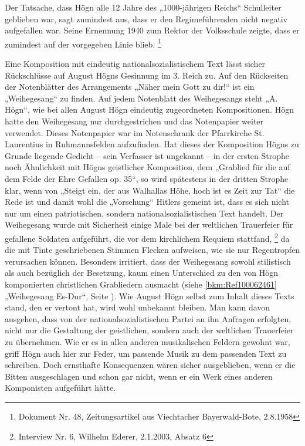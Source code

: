 Der Tatsache, dass Högn alle 12 Jahre des „1000-jährigen Reichs“
Schulleiter geblieben war, sagt zumindest aus, dass er den
Regimeführenden nicht negativ aufgefallen war. Seine Ernennung 1940 zum
Rektor der Volksschule zeigte, dass er zumindest auf der vorgegeben
Linie blieb. \footnote{Dokument Nr. 48, Zeitungsartikel aus Viechtacher
Bayerwald-Bote, 2.8.1958}

Eine Komposition mit eindeutig nationalsozialistischem Text lässt sicher
Rückschlüsse auf August Högns Gesinnung im 3. Reich zu. Auf den
Rückseiten der Notenblätter des Arrangements „Näher mein Gott zu dir!“
ist ein „Weihegesang“ zu finden. Auf jedem Notenblatt des Weihegesangs
steht „A. Högn“, wie bei allen August Högn eindeutig zugeordneten
Kompositionen. Högn hatte den Weihegesang nur durchgestrichen und das
Notenpapier weiter verwendet. Dieses Notenpapier war im Notenschrank
der Pfarrkirche St. Laurentius in Ruhmannsfelden aufzufinden. Hat
dieses der Komposition Högns zu Grunde liegende Gedicht – sein
Verfasser ist ungekannt – in der ersten Strophe noch Ähnlichkeit mit
Högns geistlicher Komposition, dem „Grablied für die auf dem Felde der
Ehre Gefallen op. 35“, so wird spätestens in der dritten Strophe klar,
wenn von „Steigt ein, der aus Walhallas Höhe, hoch ist es Zeit zur Tat“
die Rede ist und damit wohl die „Vorsehung“ Hitlers gemeint ist, dass
es sich nicht nur um einen patriotischen, sondern
nationalsozialistischen Text handelt. Der Weihegesang wurde mit
Sicherheit einige Male bei der weltlichen Trauerfeier für gefallene
Soldaten aufgeführt, die vor dem kirchlichem Requiem
stattfand, \footnote{Interview Nr. 6, Wilhelm Ederer, 2.1.2003, Absatz
6} da die mit Tinte geschriebenen Stimmen Flecken aufweisen, wie sie
nur Regentropfen verursachen können. Besonders irritiert, dass der
Weihegesang sowohl stilistisch als auch bezüglich der Besetzung, kaum
einen Unterschied zu den von Högn komponierten christlichen Grabliedern
ausmacht (siehe \ref{bkm:Ref100062461} „Weihegesang Es-Dur“, Seite
\pageref{bkm:Ref100062456}). Wie August Högn selbst zum Inhalt dieses
Texts stand, den er vertont hat, wird wohl unbekannt bleiben. Man kann
davon ausgehen, dass von der nationalsozialistischen Partei an ihn
Anfragen erfolgten, nicht nur die Gestaltung der geistlichen, sondern
auch der weltlichen Trauerfeier zu übernehmen. Wie er es in allen
anderen musikalischen Feldern gewohnt war, griff Högn auch hier zur
Feder, um passende Musik zu dem passenden Text zu schreiben. Doch
ernsthafte Konsequenzen wären sicher ausgeblieben, wenn er die Bitten
ausgeschlagen und schon gar nicht, wenn er ein Werk eines anderen
Komponisten aufgeführt hätte.

